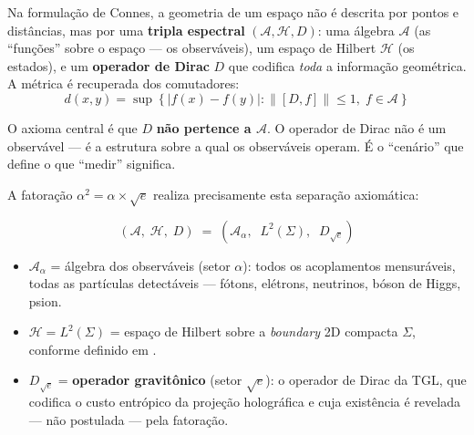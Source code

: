 \documentclass[12pt,a4paper,twoside]{article}
\newcommand{\alphaii}{\alpha^{2}}
\newcommand{\boundary}{\textit{boundary}}
\begin{document}
Na formulação de Connes, a geometria de um espaço não é descrita por pontos e distâncias, mas por uma \textbf{tripla espectral} $(\mathcal{A}, \mathcal{H}, D)$: uma álgebra $\mathcal{A}$ (as ``funções'' sobre o espaço --- os observáveis), um espaço de Hilbert $\mathcal{H}$ (os estados), e um \textbf{operador de Dirac} $D$ que codifica \textit{toda} a informação geométrica. A métrica é recuperada dos comutadores:
\begin{equation}
d(x,y) = \sup\left\{|f(x) - f(y)| : \|[D, f]\| \leq 1,\; f \in \mathcal{A}\right\}
\label{eq:connes_distance}
\end{equation}

O axioma central é que $D$ \textbf{não pertence a $\mathcal{A}$}. O operador de Dirac não é um observável --- é a estrutura sobre a qual os observáveis operam. É o ``cenário'' que define o que ``medir'' significa.

A fatoração $\alphaii = \alpha \times \sqrt{e}$ realiza precisamente esta separação axiomática:

\begin{factorbox}[title={Tripla Espectral da TGL}]
\begin{equation}
(\mathcal{A},\; \mathcal{H},\; D) \;=\; \left(\mathcal{A}_\alpha,\;\; L^2(\Sigma),\;\; D_{\sqrt{e}}\right)
\label{eq:tripla}
\end{equation}

\begin{itemize}[nosep]
\item $\mathcal{A}_\alpha$ = álgebra dos observáveis (setor $\alpha$): todos os acoplamentos mensuráveis, todas as partículas detectáveis --- fótons, elétrons, neutrinos, bóson de Higgs, psion.

\item $\mathcal{H} = L^2(\Sigma)$ = espaço de Hilbert sobre a \boundary{} 2D compacta $\Sigma$, conforme definido em \cite{Miguel2026Graviton}.

\item $D_{\sqrt{e}}$ = \textbf{operador gravitônico} (setor $\sqrt{e}$): o operador de Dirac da TGL, que codifica o custo entrópico da projeção holográfica e cuja existência é revelada --- não postulada --- pela fatoração.
\end{itemize}
\end{factorbox}
\end{document}
